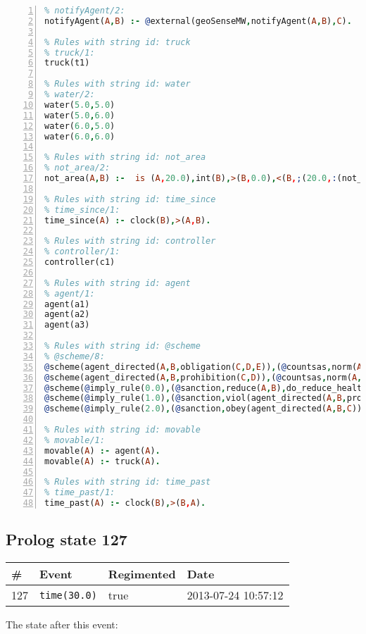 \documentclass[11pt]{article}\usepackage[utf8]{inputenc}\usepackage{geometry}
\begin{document}
\begin{lstlisting}[language=Prolog, numbers=left]
% Rules with string id: notifyAgent
% notifyAgent/2:
notifyAgent(A,B) :- @external(geoSenseMW,notifyAgent(A,B),C).

% Rules with string id: truck
% truck/1:
truck(t1)

% Rules with string id: water
% water/2:
water(5.0,5.0)
water(5.0,6.0)
water(6.0,5.0)
water(6.0,6.0)

% Rules with string id: not_area
% not_area/2:
not_area(A,B) :-  is (A,20.0),int(B),>(B,0.0),<(B,;(20.0,:(not_area(A,B), is (-(B),20.0)))),int(A),>(A,0.0),<(A,;(20.0,:(area(A,B),-(int(A))))),int(B),>(A,0.0),>(B,0.0),<(A,21.0),<(B,21.0).

% Rules with string id: time_since
% time_since/1:
time_since(A) :- clock(B),>(A,B).

% Rules with string id: controller
% controller/1:
controller(c1)

% Rules with string id: agent
% agent/1:
agent(a1)
agent(a2)
agent(a3)

% Rules with string id: @scheme
% @scheme/8:
@scheme(agent_directed(A,B,obligation(C,D,E)),(@countsas,norm(A,B,F,obligation(C,D,E)),F),false,(listTrue(C)),(time_past(D)),false,[plus(viol(agent_directed(A,B,obligation(C,D,E))))|[]],[plus(obey(agent_directed(A,B,obligation(C,D,E))))|[]])
@scheme(agent_directed(A,B,prohibition(C,D)),(@countsas,norm(A,B,E,prohibition(C,D)),E),(listTrue(C)),false,(false),false,[plus(viol(agent_directed(A,B,prohibition(C,D))))|[]],[plus(obey(agent_directed(A,B,prohibition(C,D))))|[]])
@scheme(@imply_rule(0.0),(@sanction,reduce(A,B),do_reduce_health(A,B),notifyAgent(A,changed(status))),true,false,false,false,[min(reduce(A,B))|[]],[])
@scheme(@imply_rule(1.0),(@sanction,viol(agent_directed(A,B,prohibition(C,D))),do_sanction(D)),true,false,false,false,[min(viol(agent_directed(A,B,prohibition(C,D))))|[]],[])
@scheme(@imply_rule(2.0),(@sanction,obey(agent_directed(A,B,C))),true,false,false,false,[min(obey(agent_directed(A,B,C)))|[]],[])

% Rules with string id: movable
% movable/1:
movable(A) :- agent(A).
movable(A) :- truck(A).

% Rules with string id: time_past
% time_past/1:
time_past(A) :- clock(B),>(B,A).

\end{lstlisting}
\clearpage 
\subsection{Prolog state 127}
\begin{table}[ht]
\centering 
\begin{tabular}{l l l l} 
\textbf{\#} & \textbf{Event} & \textbf{Regimented} & \textbf{Date} \\ [0.5ex] 
\hline
127&\texttt{time(30.0)}&true&2013-07-24 10:57:12\\ [1ex] \hline\end{tabular}
\end{table}
The state after this event:
\end{document}
